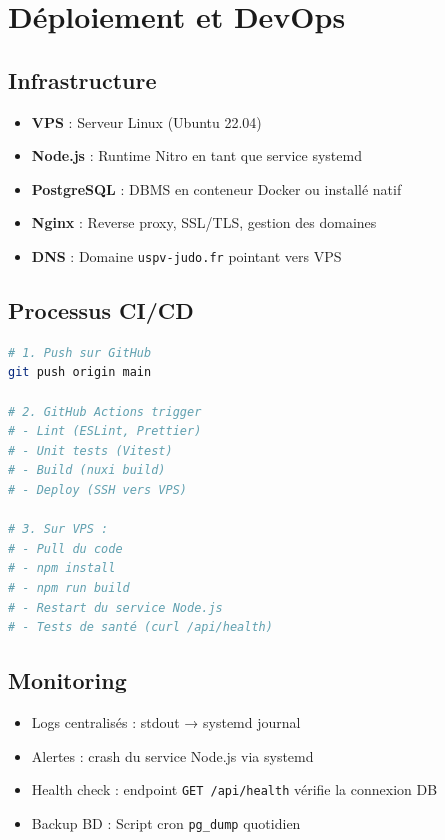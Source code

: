 \documentclass[11pt,a4paper]{article}
\begin{document}
\section{Déploiement et DevOps}

\subsection{Infrastructure}

\begin{itemize}
  \item \textbf{VPS} : Serveur Linux (Ubuntu 22.04)
  \item \textbf{Node.js} : Runtime Nitro en tant que service systemd
  \item \textbf{PostgreSQL} : DBMS en conteneur Docker ou installé natif
  \item \textbf{Nginx} : Reverse proxy, SSL/TLS, gestion des domaines
  \item \textbf{DNS} : Domaine \texttt{uspv-judo.fr} pointant vers VPS
\end{itemize}

\subsection{Processus CI/CD}

\begin{lstlisting}[language=bash]
# 1. Push sur GitHub
git push origin main

# 2. GitHub Actions trigger
# - Lint (ESLint, Prettier)
# - Unit tests (Vitest)
# - Build (nuxi build)
# - Deploy (SSH vers VPS)

# 3. Sur VPS :
# - Pull du code
# - npm install
# - npm run build
# - Restart du service Node.js
# - Tests de santé (curl /api/health)
\end{lstlisting}

\subsection{Monitoring}

\begin{itemize}
  \item Logs centralisés : stdout → systemd journal
  \item Alertes : crash du service Node.js via systemd
  \item Health check : endpoint \texttt{GET /api/health} vérifie la connexion DB
  \item Backup BD : Script cron \texttt{pg\_dump} quotidien
\end{itemize}
\end{document}
